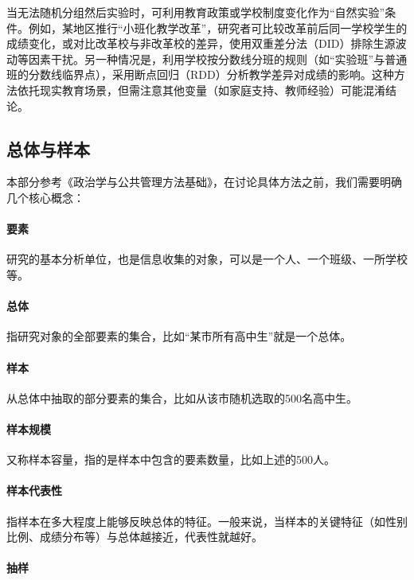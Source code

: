 当无法随机分组然后实验时，可利用教育政策或学校制度变化作为``自然实验''条件。例如，某地区推行``小班化教学改革''，研究者可比较改革前后同一学校学生的成绩变化，或对比改革校与非改革校的差异，使用双重差分法（DID）排除生源波动等因素干扰。另一种情况是，利用学校按分数线分班的规则（如``实验班''与普通班的分数线临界点），采用断点回归（RDD）分析教学差异对成绩的影响。这种方法依托现实教育场景，但需注意其他变量（如家庭支持、教师经验）可能混淆结论。

\subsection{总体与样本}

本部分参考《政治学与公共管理方法基础》，在讨论具体方法之前，我们需要明确几个核心概念：

\paragraph*{要素}

研究的基本分析单位，也是信息收集的对象，可以是一个人、一个班级、一所学校等。

\paragraph*{总体}

指研究对象的全部要素的集合，比如``某市所有高中生''就是一个总体。

\paragraph*{样本}

从总体中抽取的部分要素的集合，比如从该市随机选取的500名高中生。

\paragraph*{样本规模}

又称样本容量，指的是样本中包含的要素数量，比如上述的500人。

\paragraph*{样本代表性}

指样本在多大程度上能够反映总体的特征。一般来说，当样本的关键特征（如性别比例、成绩分布等）与总体越接近，代表性就越好。

\paragraph*{抽样}


